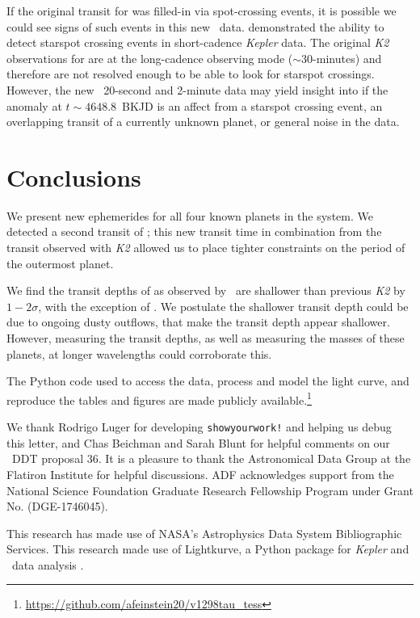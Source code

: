 \documentclass[twocolumn]{aastex631}
\begin{document}
If the original transit for \planete was filled-in via spot-crossing events, it is possible we could see signs of such events in this new \tess\ data. \cite{morris17} demonstrated the ability to detect starspot crossing events in short-cadence \textit{Kepler} data. The original \textit{K2} observations for \sname are at the long-cadence observing mode ($\sim 30$-minutes) and therefore are not resolved enough to be able to look for starspot crossings. However, the new \tess\ 20-second and 2-minute data may yield insight into if the anomaly at $t \sim 4648.8$~BKJD is an affect from a starspot crossing event, an overlapping transit of a currently unknown planet, or general noise in the data.

\section{Conclusions} \label{sec:conclusions}

We present new ephemerides for all four known planets in the \sname system. We detected a second transit of \planete; this new transit time in combination from the transit observed with \textit{K2} allowed us to place tighter constraints on the period of the outermost planet.

We find the transit depths of \planetknown as observed by \tess\ are shallower than previous \textit{K2} by $1-2\sigma$, with the exception of \planete. We postulate the shallower transit depth could be due to ongoing dusty outflows, that make the transit depth appear shallower. However, measuring the transit depths, as well as measuring the masses of these planets, at longer wavelengths could corroborate this.

The Python code used to access the data, process and model the light curve, and reproduce the tables and figures are made publicly available.\footnote{\url{https://github.com/afeinstein20/v1298tau_tess}}

\begin{acknowledgments}
We thank Rodrigo Luger for developing \texttt{showyourwork!} \citep{luger21} and helping us debug this letter, and Chas Beichman and Sarah Blunt for helpful comments on our \tess\ DDT proposal 36. It is a pleasure to thank the Astronomical Data Group at the Flatiron Institute for helpful discussions. ADF acknowledges support from the National Science Foundation Graduate Research Fellowship Program under Grant No. (DGE-1746045).

This research has made use of NASA's Astrophysics Data System Bibliographic Services. This research made use of Lightkurve, a Python package for \textit{Kepler} and \tess\ data analysis \citep{lightkurve}.

\end{acknowledgments}
\end{document}
